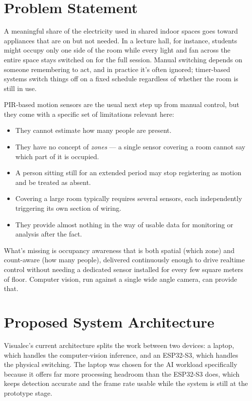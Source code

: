 \documentclass[conference]{IEEEtran}
\begin{document}
\section{Problem Statement}
A meaningful share of the electricity used in shared indoor spaces goes toward appliances that are on but not needed. In a lecture hall, for instance, students might occupy only one side of the room while every light and fan across the entire space stays switched on for the full session. Manual switching depends on someone remembering to act, and in practice it's often ignored; timer-based systems switch things off on a fixed schedule regardless of whether the room is still in use.

PIR-based motion sensors are the usual next step up from manual control, but they come with a specific set of limitations relevant here:
\begin{itemize}
    \item They cannot estimate how many people are present.
    \item They have no concept of \textit{zones} --- a single sensor covering a room cannot say which part of it is occupied.
    \item A person sitting still for an extended period may stop registering as motion and be treated as absent.
    \item Covering a large room typically requires several sensors, each independently triggering its own section of wiring.
    \item They provide almost nothing in the way of usable data for monitoring or analysis after the fact.
\end{itemize}

What's missing is occupancy awareness that is both spatial (which zone) and count-aware (how many people), delivered continuously enough to drive realtime control without needing a dedicated sensor installed for every few square meters of floor. Computer vision, run against a single wide angle camera, can provide that.

\section{Proposed System Architecture}
Visualec's current architecture splits the work between two devices: a laptop, which handles the computer-vision inference, and an ESP32-S3, which handles the physical switching. The laptop was chosen for the AI workload specifically because it offers far more processing headroom than the ESP32-S3 does, which keeps detection accurate and the frame rate usable while the system is still at the prototype stage.
\end{document}
